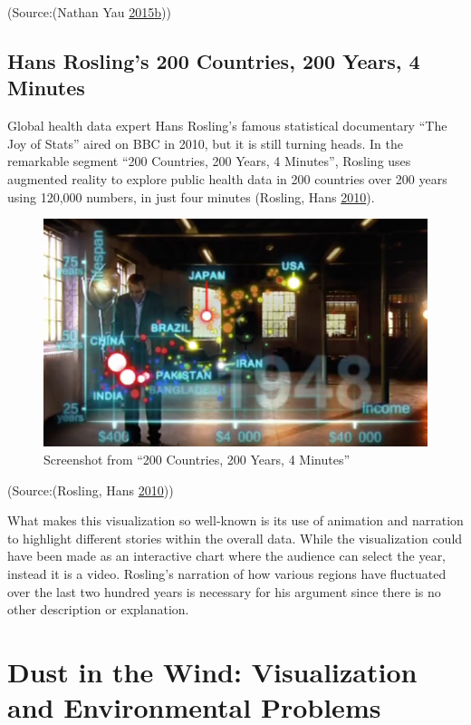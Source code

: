 \documentclass[]{book}
\theoremstyle{definition}
\theoremstyle{definition}
\theoremstyle{definition}
\theoremstyle{remark}
\begin{document}
(Source:(Nathan Yau
\protect\hyperlink{ref-American_life}{2015}\protect\hyperlink{ref-American_life}{b}))

\subsection{Hans Rosling's 200 Countries, 200 Years, 4
Minutes}\label{hans-roslings-200-countries-200-years-4-minutes}

Global health data expert Hans Rosling's famous statistical documentary
``The Joy of Stats'' aired on BBC in 2010, but it is still turning
heads. In the remarkable segment ``200 Countries, 200 Years, 4
Minutes'', Rosling uses augmented reality to explore public health data
in 200 countries over 200 years using 120,000 numbers, in just four
minutes (Rosling, Hans \protect\hyperlink{ref-hans_rosling}{2010}).

\begin{figure}
\centering
\includegraphics{images/200_countries_years.png}
\caption{Screenshot from ``200 Countries, 200 Years, 4 Minutes''}
\end{figure}

(Source:(Rosling, Hans \protect\hyperlink{ref-hans_rosling}{2010}))

What makes this visualization so well-known is its use of animation and
narration to highlight different stories within the overall data. While
the visualization could have been made as an interactive chart where the
audience can select the year, instead it is a video. Rosling's narration
of how various regions have fluctuated over the last two hundred years
is necessary for his argument since there is no other description or
explanation.

\section{Dust in the Wind: Visualization and Environmental
Problems}\label{dust-in-the-wind-visualization-and-environmental-problems}
\end{document}
